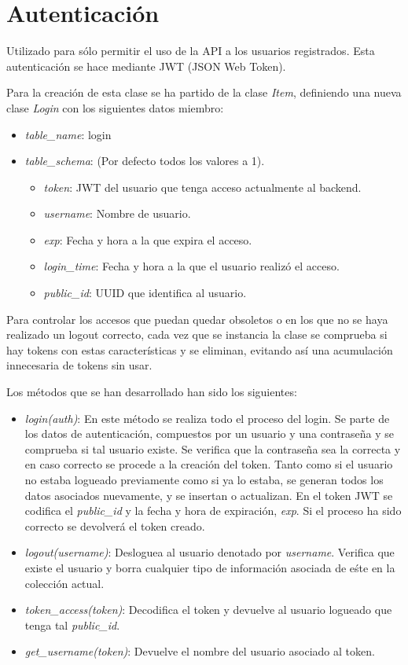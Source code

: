 \section{Autenticación}

Utilizado para sólo permitir el uso de la API a los usuarios registrados. Esta autenticación se hace mediante JWT (JSON Web Token).

\bigskip
Para la creación de esta clase se ha partido de la clase \textit{Item}, definiendo una nueva clase \textit{Login} con los siguientes datos miembro:
\begin{itemize}
	\item \textit{table\_name}: login
	\item \textit{table\_schema}: (Por defecto todos los valores a 1).
	\begin{itemize}
		\item \textit{token}: JWT del usuario que tenga acceso actualmente al backend.
		\item \textit{username}: Nombre de usuario.
		\item \textit{exp}: Fecha y hora a la que expira el acceso.
		\item \textit{login\_time}: Fecha y hora a la que el usuario realizó el acceso.
		\item \textit{public\_id}: UUID que identifica al usuario.
	\end{itemize}
\end{itemize}



\bigskip
Para controlar los accesos que puedan quedar obsoletos o en los que no se haya realizado un logout correcto, cada vez que se instancia la clase se comprueba si hay tokens con estas características y se eliminan, evitando así una acumulación innecesaria de tokens sin usar.

\bigskip
Los métodos que se han desarrollado han sido los siguientes:

\begin{itemize}
	\item \textit{login(auth)}: En este método se realiza todo el proceso del login. Se parte de los datos de autenticación, compuestos por un usuario y una contraseña y se comprueba si tal usuario existe. Se verifica que la contraseña sea la correcta y en caso correcto se procede a la creación del token. Tanto como si el usuario no estaba logueado previamente como si ya lo estaba, se generan todos los datos asociados nuevamente, y se insertan o actualizan. En el token JWT se codifica el \textit{public\_id} y la fecha y hora de expiración, \textit{exp}. Si el proceso ha sido correcto se devolverá el token creado.
	\item \textit{logout(username)}: Desloguea al usuario denotado por \textit{username}. Verifica que existe el usuario y borra cualquier tipo de información asociada de eśte en la colección actual.
	\item \textit{token\_access(token)}: Decodifica el token y devuelve al usuario logueado que tenga tal \textit{public\_id}.
	\item \textit{get\_username(token)}: Devuelve el nombre del usuario asociado al token.
\end{itemize}



